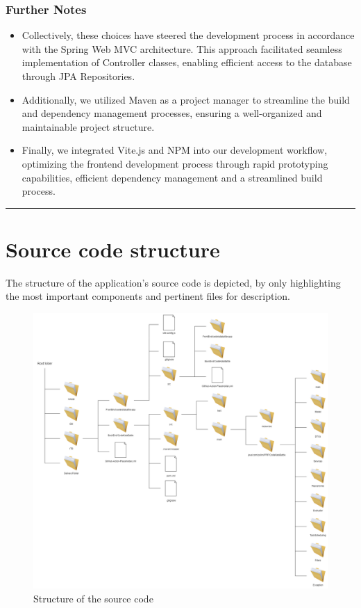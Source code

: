 \documentclass{Configuration_Files/Template}
\begin{document}
\subsection{Further Notes}

\begin{itemize}
    \item Collectively, these choices have steered the development process in accordance with the Spring Web MVC architecture. This approach facilitated seamless implementation of Controller classes, enabling efficient access to the database through JPA Repositories.
    \item Additionally, we utilized Maven as a project manager to streamline the build and dependency management processes, ensuring a well-organized and maintainable project structure.
    \item Finally, we integrated Vite.js and NPM into our development workflow, optimizing the frontend development process through rapid prototyping capabilities, efficient dependency management and a streamlined build process.
\end{itemize}

{\color{bluepoli}\rule{\linewidth}{0.1pt}}


\chapter{Source code structure}

The structure of the application's source code is depicted, by only highlighting the most important components and pertinent files for description.\\

\begin{figure}[h]
    \centering
    \includegraphics[scale = 0.25]{ITD_latex/Images/SourceCodeStructure.png}
    \caption{Structure of the source code}
\end{figure}
\end{document}
